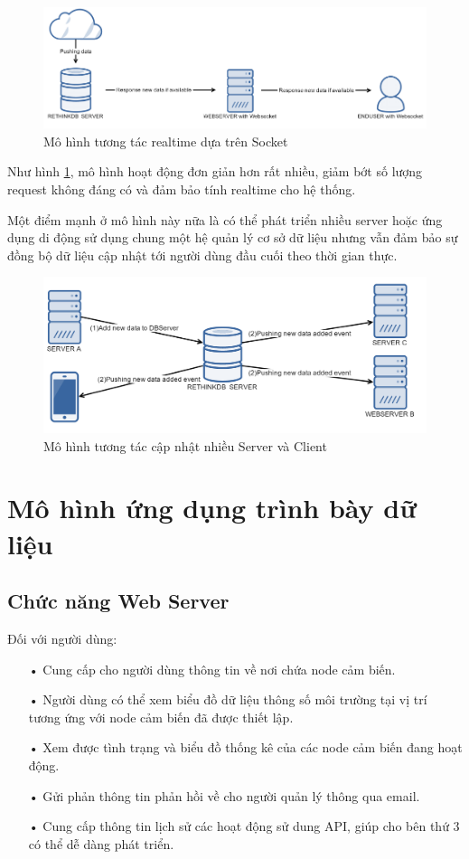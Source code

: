 \begin{figure}[H]
	\centering    
	\includegraphics[width=1.0\textwidth]{realtime}
	\caption[Mô hình tương tác realtime dựa trên Socket]{Mô hình tương tác realtime dựa trên Socket}
	\label{fig: realtime}
\end{figure}

Như hình \ref{fig: realtime}, mô hình hoạt động đơn giản hơn rất nhiều, giảm bớt số lượng request không đáng có và đảm bảo tính realtime cho hệ thống.

Một điểm mạnh ở mô hình này nữa là có thể phát triển nhiều server hoặc ứng dụng di động sử dụng chung một hệ quản lý cơ sở dữ liệu nhưng vẫn đảm bảo sự đồng bộ dữ liệu cập nhật tới người dùng đầu cuối theo thời gian thực.
\begin{figure}[H]
	\centering    
	\includegraphics[width=1.0\textwidth]{multiserver}
	\caption[Mô hình tương tác cập nhật nhiều Server]{Mô hình tương tác cập nhật nhiều Server và Client}
	\label{fig: multiserver}
\end{figure}
\section{Mô hình ứng dụng trình bày dữ liệu}
\subsection*{Chức năng Web Server}
Đối với người dùng:
\begin{itemize}
\item[•] Cung cấp cho người dùng thông tin về nơi chứa node cảm biến.
\item[•] Người dùng có thể xem biểu đồ dữ liệu thông số môi trường tại vị trí tương ứng với node cảm biến đã được thiết lập.
\item[•] Xem được tình trạng và biểu đồ thống kê của các node cảm biến đang hoạt động.
\item[•] Gửi phản thông tin phản hồi về cho người quản lý thông qua email.
\item[•] Cung cấp thông tin lịch sử các hoạt động sử dung API, giúp cho bên thứ 3 có thể dễ dàng phát triển.
\end{itemize}

